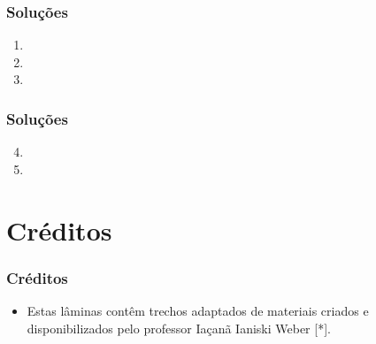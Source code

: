 \documentclass[aspectratio=169]{beamer}
\begin{document}
\begin{frame}\frametitle{Soluções}
\begin{enumerate}
	\item 

	\item 

	\item 
\end{enumerate}
\end{frame}

\begin{frame}\frametitle{Soluções}
\begin{enumerate}
        \setcounter{enumi}{3}
	\item 

	\item 

\end{enumerate}
\end{frame}

\section{Créditos}

\begin{frame}\frametitle{Créditos}
\begin{itemize}
	\item Estas lâminas contêm trechos adaptados de materiais criados e disponibilizados pelo professor Iaçanã Ianiski Weber [*].
\end{itemize}
\end{frame}

\end{document}
